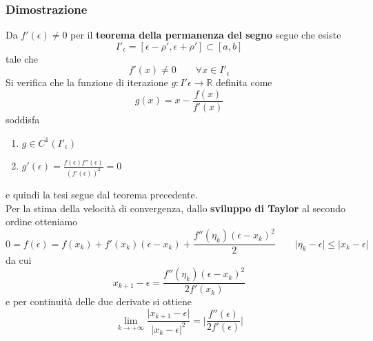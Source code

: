 \subsubsection{Dimostrazione}
Da $f'(\epsilon) \neq 0$ per il \textbf{teorema della permanenza del segno} segue che esiste
\begin{equation*}
	I'_\epsilon = [\epsilon - \rho', \epsilon + \rho'] \subset [a,b]
\end{equation*}
tale che
\begin{equation*}
	f'(x) \neq 0 \quad\quad \forall x \in I'_\epsilon
\end{equation*}
Si verifica che la funzione di iterazione $g: I'\epsilon \to \mathbb{R}$ definita come
\begin{equation*}
	g(x) = x - \frac{f(x)}{f'(x)}
\end{equation*}
soddisfa
\begin{enumerate}
	\item $g \in C^1(I'_\epsilon)$
	\item $g'(\epsilon) = \frac{f(\epsilon)f''(\epsilon)}{(f'(\epsilon))^2}=0$
\end{enumerate}
e quindi la tesi segue dal teorema precedente.\\
Per la stima della velocità di convergenza, dallo \textbf{sviluppo di Taylor} al secondo ordine otteniamo
\begin{equation*}
	0 = f(\epsilon) = f(x_k) + f'(x_k)(\epsilon - x_k) + \frac{f''(\eta_k)(\epsilon - x_k)^2}{2} \quad\quad \lvert \eta_k - \epsilon \rvert \leq \lvert x_k - \epsilon \rvert
\end{equation*}
da cui
\begin{equation*}
	x_{k+1} - \epsilon = \frac{f''(\eta_k)(\epsilon - x_k)^2}{2 f'(x_k)}
\end{equation*}
e per continuità delle due derivate si ottiene
\begin{equation*}
	\lim_{k \to +\infty} \frac{\lvert x_{k+1} - \epsilon \rvert}{\lvert x_k - \epsilon \rvert^2} = \bigg\lvert \frac{f''(\epsilon)}{2f'(\epsilon)} \bigg\rvert
\end{equation*}